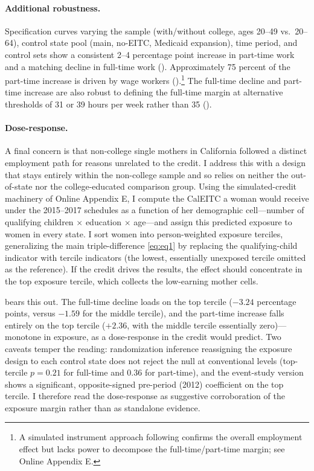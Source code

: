 \documentclass[11pt]{article}
\let\Cref\crtCref
\begin{document}

\paragraph{Additional robustness.} Specification curves varying the sample (with/without college, ages 20--49 vs.\ 20--64), control state pool (main, no-EITC, Medicaid expansion), time period, and control sets show a consistent 2--4 percentage point increase in part-time work and a matching decline in full-time work (\Cref{fig:appA_specurve}). Approximately 75 percent of the part-time increase is driven by wage workers (\Cref{sec:app_self}).\footnote{A simulated instrument approach following \cite{gruber_elasticity_2002} confirms the overall employment effect but lacks power to decompose the full-time/part-time margin; see Online Appendix E.} The full-time decline and part-time increase are also robust to defining the full-time margin at alternative thresholds of 31 or 39 hours per week rather than 35 (\Cref{tab:alt_threshold}).



\paragraph{Dose-response.} A final concern is that non-college single mothers in California followed a distinct employment path for reasons unrelated to the credit. I address this with a design that stays entirely within the non-college sample and so relies on neither the out-of-state nor the college-educated comparison group. Using the simulated-credit machinery of Online Appendix E, I compute the CalEITC a woman would receive under the 2015--2017 schedules as a function of her demographic cell---number of qualifying children $\times$ education $\times$ age---and assign this predicted exposure to women in every state. I sort women into person-weighted exposure terciles, generalizing the main triple-difference \eqref{eq:eq1} by replacing the qualifying-child indicator with tercile indicators (the lowest, essentially unexposed tercile omitted as the reference). If the credit drives the results, the effect should concentrate in the top exposure tercile, which collects the low-earning mother cells.

\Cref{tab:dose} bears this out. The full-time decline loads on the top tercile ($-3.24$ percentage points, versus $-1.59$ for the middle tercile), and the part-time increase falls entirely on the top tercile ($+2.36$, with the middle tercile essentially zero)---monotone in exposure, as a dose-response in the credit would predict. Two caveats temper the reading: randomization inference reassigning the exposure design to each control state does not reject the null at conventional levels (top-tercile $p = 0.21$ for full-time and $0.36$ for part-time), and the event-study version shows a significant, opposite-signed pre-period (2012) coefficient on the top tercile. I therefore read the dose-response as suggestive corroboration of the exposure margin rather than as standalone evidence.
\end{document}
